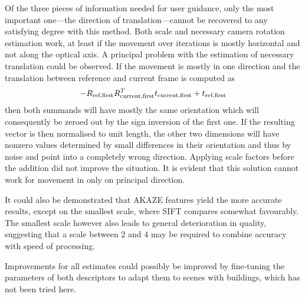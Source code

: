 Of the three pieces of information needed for user guidance, only the most
important one---the direction of translation---cannot be recovered to any
satisfying degree with this method. Both scale and necessary camera
rotation estimation work, at least if the movement over iterations is mostly
horizontal and not along the optical axis. A principal problem with the
estimation of necessary translation could be observed. If the movement is mostly
in one direction and the translation between reference and current frame is computed as
\begin{equation*}
   -R_{\text{ref,first}}R^T_{\text{current,first}}t_{\text{current,first}} + t_{\text{ref,first}}
\end{equation*}
then both summands will have mostly the same orientation which will consequently
be zeroed out by the sign inversion of the first one. If the resulting vector is
then normalised to unit length, the other two dimensions will have nonzero
values determined by small differences in their orientation and thus by noise
and point into a completely wrong direction. Applying scale factors before the
addition did not improve the situation. It is evident that this solution cannot
work for movement in only on principal direction.

It could also be demonstrated that AKAZE features yield the more accurate
results, except on the smallest scale, where SIFT compares somewhat favourably.
The smallest scale however also leads to general deterioration in quality,
suggesting that a scale between $2$ and $4$ may be required to combine accuracy
with speed of processing.

Improvements for all estimates could possibly be improved by fine-tuning the
parameters of both descriptors to adapt them to scenes with buildings, which has
not been tried here.
